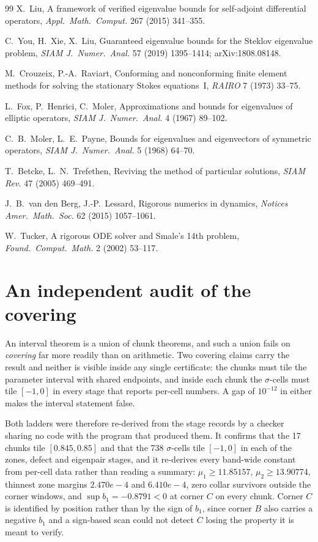 \documentclass[11pt]{article}
\begin{document}
\begin{thebibliography}{99}
 X.~Liu, A framework of verified eigenvalue bounds
for self-adjoint differential operators, \emph{Appl.\ Math.\ Comput.}
267 (2015) 341--355.

 C.~You, H.~Xie, X.~Liu, Guaranteed eigenvalue
bounds for the Steklov eigenvalue problem, \emph{SIAM J.\ Numer.\
Anal.} 57 (2019) 1395--1414; arXiv:1808.08148.

 M.~Crouzeix, P.-A.~Raviart, Conforming and
nonconforming finite element methods for solving the stationary Stokes
equations~I, \emph{RAIRO} 7 (1973) 33--75.

 L.~Fox, P.~Henrici, C.~Moler, Approximations and bounds
for eigenvalues of elliptic operators, \emph{SIAM J.\ Numer.\ Anal.} 4
(1967) 89--102.

 C.~B.~Moler, L.~E.~Payne, Bounds for eigenvalues
and eigenvectors of symmetric operators, \emph{SIAM J.\ Numer.\ Anal.}
5 (1968) 64--70.

 T.~Betcke, L.~N.~Trefethen, Reviving the
method of particular solutions, \emph{SIAM Rev.} 47 (2005) 469--491.

 J.~B.~van den Berg, J.-P.~Lessard, Rigorous numerics in
dynamics, \emph{Notices Amer.\ Math.\ Soc.} 62 (2015) 1057--1061.

 W.~Tucker, A rigorous ODE solver and Smale's 14th
problem, \emph{Found.\ Comput.\ Math.} 2 (2002) 53--117.

\end{thebibliography}


\section{An independent audit of the covering}\label{sec:covering-audit}

An interval theorem is a union of chunk theorems, and such a union fails on
\emph{covering} far more readily than on arithmetic. Two covering claims carry
the result and neither is visible inside any single certificate: the chunks
must tile the parameter interval with shared endpoints, and inside each chunk
the $\sigma$-cells must tile $[-1,0]$ in every stage that reports per-cell
numbers. A gap of $10^{-12}$ in either makes the interval statement false.

Both ladders were therefore re-derived from the stage records by a checker
sharing no code with the program that produced them. It confirms that the
17 chunks tile $[0.845, 0.85]$ and that
the 738 $\sigma$-cells tile $[-1,0]$ in each of the zones,
defect and eigenpair stages, and it re-derives every band-wide constant from
per-cell data rather than reading a summary: $\mu_1 \ge 11.85157$,
$\mu_2 \ge 13.90774$, thinnest zone margins
$2.470e-4$ and $6.410e-4$,
zero collar survivors outside the corner windows, and $\sup b_1 = -0.8791 < 0$
at corner $C$ on every chunk. Corner $C$ is identified by position rather than
by the sign of $b_1$, since corner $B$ also carries a negative $b_1$ and a
sign-based scan could not detect $C$ losing the property it is meant to verify.
\end{document}
